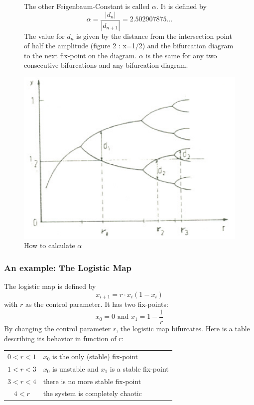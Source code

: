 \begin{figure}[H]
\begin{minipage}{0.4\textwidth}
The other Feigenbaum-Constant is called $\alpha$. It is defined by \begin{equation} \alpha = \frac{|d_n|}{|d_{n+1}|}=2.502907875\dots\end{equation} The value for $d_n$ is given by the distance from the intersection point of half the amplitude (figure 2 : x=1/2) and the bifurcation diagram to the next fix-point on the diagram. $\alpha$ is the same for any two consecutive bifurcations and any bifurcation diagram.
\end{minipage}
\begin{minipage}{0.6\textwidth}
\includegraphics[width=\textwidth]{Bilder/alpha.png}
\caption{How to calculate $\alpha$}
\end{minipage}
\end{figure}

\subsubsection{An example: The Logistic Map}

The logistic map is defined by $$x_{i+1}=r\cdot x_i(1-x_i)$$ with $r$ as the control parameter. It has two fix-points: $$x_0 = 0 \text{\ and \ } x_1 = 1-\frac{1}{r}$$ By changing the control parameter $r$, the logistic map bifurcates. Here is a table describing its behavior in function of $r$:\\

\begin{tabular}{c l}
$0 < r < 1$ & $x_0$ is the only (stable) fix-point\\
$1 < r < 3$ & $x_0$ is unstable and $x_1$ is a stable fix-point\\
$3 < r < 4$ & there is no more stable fix-point\\
$4 < r$ & the system is completely chaotic
\end{tabular}

